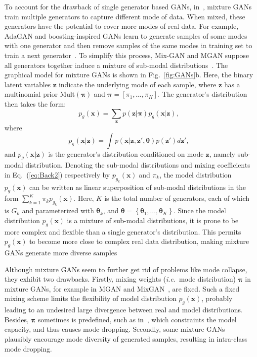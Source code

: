 \documentclass{article}
\def\ie{\emph{i.e.}}
\begin{document}
To account for the drawback of single generator based GANs, in~\cite{hoang2018mgan,tolstikhin2017adagan,arora2017generalization}, mixture GANs train multiple generators to capture different mode of data.
When mixed, these generators have the potential to cover more modes of real data.
For example, AdaGAN and boosting-inspired GANs learn to generate samples of some modes with one generator and then remove samples of the same modes in training set to train a next generator~\cite{tolstikhin2017adagan}.
To simplify this process, Mix-GAN and MGAN suppose all generators together induce a mixture of sub-modal distributions~\cite{hoang2018mgan,arora2017generalization}.
The graphical model for mixture GANs is shown in Fig.~\ref{fig:GANs}b.
Here, the binary latent variables $\mathbf{z}$ indicate the underlying mode of each sample, where $\mathbf{z}$ has a multinomial prior $\text{Mult}\left(\bm{\pi}\right)$ and $\bm{\pi}=\left[\pi_1,...,\pi_K\right]$.
The generator's distribution then takes the form:
\begin{equation}
p_g\left(\mathbf{x}\right)
=
\sum_{\mathbf{z}} p\left(\mathbf{z}|\bm{\pi}\right) p_g\left(\mathbf{x}|\mathbf{z}\right),
\label{eq:Back2}
\end{equation}
where
\begin{equation}
p_g\left(\mathbf{x}|\mathbf{z}\right) = \int
p\left(\mathbf{x}|\mathbf{z}, \mathbf{z}', \bm{\theta}\right) p\left(\mathbf{z}'\right)
d\mathbf{z}',
\label{eq:Back3}
\end{equation}
and $p_g\left(\mathbf{x}|\mathbf{z}\right)$ is the generator's distribution conditioned on mode $\mathbf{z}$, namely sub-modal distribution.
Denoting the sub-modal distributions and mixing coefficients in Eq.~(\ref{eq:Back2}) respectively by $p_{g_k}\left(\mathbf{x}\right)$ and $\pi_k$, the model distribution $p_g\left(\mathbf{x}\right)$ can be written as linear superposition of sub-modal distributions in the form $\sum_{k=1}^K\pi_k p_{g_k}\left(\mathbf{x}\right)$.
Here,  $K$ is the total number of generators, each of which is $G_k$ and parameterized with $\bm{\theta}_k$, and $\bm{\theta}=\left\{\bm{\theta}_1,...,\bm{\theta}_K\right\}$.
Since the model distribution $p_g\left(\mathbf{x}\right)$ is a mixture of sub-modal distributions, it is prone to be more complex and flexible than a single generator's distribution.
This permits $p_g\left(\mathbf{x}\right)$ to become more close to complex real data distribution, making mixture GANs generate more diverse samples


Although mixture GANs seem to further get rid of problems like mode collapse, they exhibit two drawbacks.
Firstly, mixing weights (\ie~mode distribution) $\bm{\pi}$ in mixture GANs, for example in MGAN and MixGAN~\cite{hoang2018mgan,arora2017generalization}, are fixed.
Such a fixed mixing scheme limits the flexibility of model distribution $p_g\left(\mathbf{x}\right)$, probably leading to an undesired large divergence between real and model distributions.
Besides, $\bm{\pi}$ sometimes is predefined, such as in~\cite{hoang2018mgan}, which constraints the model capacity, and thus causes mode dropping.
Secondly, some mixture GANs~\cite{hoang2018mgan} plausibly encourage mode diversity of generated samples, resulting in intra-class mode dropping.
\end{document}
